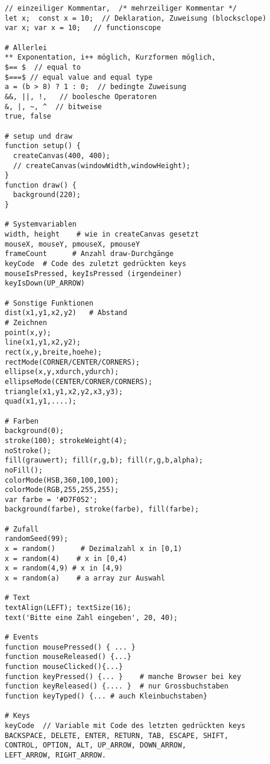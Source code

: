 \documentclass[a4paper,11pt,landscape,twocolumn]{book}
\begin{document}
\parskip 4pt
\thispagestyle{ErsteSeite}
\footnotesize
\lstset{tabsize=4, basicstyle=\footnotesize, showstringspaces=false,mathescape=true}

\begin{lstlisting} 
// einzeiliger Kommentar,  /* mehrzeiliger Kommentar */ 
let x;  const x = 10;  // Deklaration, Zuweisung (blocksclope)
var x; var x = 10;   // functionscope

# Allerlei
** Exponentation, i++ möglich, Kurzformen möglich,
$== $  // equal to
$===$ // equal value and equal type
a = (b > 8) ? 1 : 0;  // bedingte Zuweisung
&&, ||, !,   // boolesche Operatoren
&, |, ~, ^  // bitweise
true, false

# setup und draw
function setup() {             
  createCanvas(400, 400);
  // createCanvas(windowWidth,windowHeight);   
}
function draw() {
  background(220);
} 

# Systemvariablen
width, height    # wie in createCanvas gesetzt
mouseX, mouseY, pmouseX, pmouseY
frameCount      # Anzahl draw-Durchgänge
keyCode  # Code des zuletzt gedrückten keys
mouseIsPressed, keyIsPressed (irgendeiner)
keyIsDown(UP_ARROW)

# Sonstige Funktionen
dist(x1,y1,x2,y2)   # Abstand  
# Zeichnen
point(x,y);
line(x1,y1,x2,y2);
rect(x,y,breite,hoehe);
rectMode(CORNER/CENTER/CORNERS);
ellipse(x,y,xdurch,ydurch);
ellipseMode(CENTER/CORNER/CORNERS);
triangle(x1,y1,x2,y2,x3,y3);
quad(x1,y1,....);

# Farben
background(0); 
stroke(100); strokeWeight(4);
noStroke();
fill(grauwert); fill(r,g,b); fill(r,g,b,alpha);
noFill();
colorMode(HSB,360,100,100);
colorMode(RGB,255,255,255);
var farbe = '#D7F052';  
background(farbe), stroke(farbe), fill(farbe);

# Zufall
randomSeed(99);
x = random()      # Dezimalzahl x in [0,1)  
x = random(4)    # x in [0,4)
x = random(4,9) # x in [4,9)
x = random(a)    # a array zur Auswahl

# Text 
textAlign(LEFT); textSize(16);
text('Bitte eine Zahl eingeben', 20, 40);

# Events
function mousePressed() { ... }
function mouseReleased() {...}
function mouseClicked(){...}  
function keyPressed() {... }    # manche Browser bei key 
function keyReleased() {.... }  # nur Grossbuchstaben
function keyTyped() {... # auch Kleinbuchstaben}

# Keys
keyCode  // Variable mit Code des letzten gedrückten keys
BACKSPACE, DELETE, ENTER, RETURN, TAB, ESCAPE, SHIFT,
CONTROL, OPTION, ALT, UP_ARROW, DOWN_ARROW, 
LEFT_ARROW, RIGHT_ARROW.


\end{lstlisting}
\end{document}
